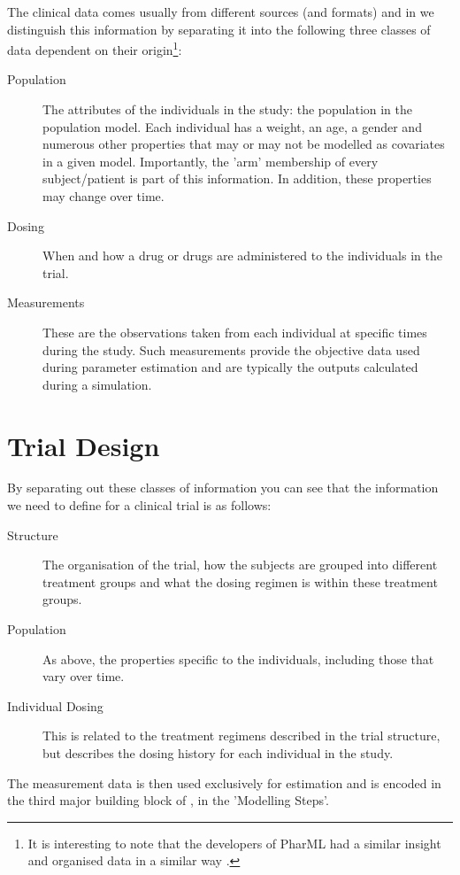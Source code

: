 
The clinical data comes usually from different sources (and formats) and 
in \pharmml we distinguish this information by separating it into the following three
classes of data dependent on their origin\footnote{It is interesting to note that the developers of
PharML had a similar insight and organised data in a similar
way \cite{NLMEcons:2008}.}:
%
\begin{description}
\item[Population] The attributes of the individuals in the study: the
  population in the population model. Each individual has a weight,
  an age, a gender and numerous other properties that may or may not
  be modelled as covariates in a given model. Importantly, the 'arm' 
  membership of every subject/patient is part of this information.
  In addition, these properties may change over time. 
\item[Dosing] When and how a drug or drugs are administered to the
  individuals in the trial.
\item[Measurements] These are the observations taken from each
  individual at specific times during the study. Such measurements
  provide the objective data used during parameter estimation and are
  typically the outputs calculated during a simulation.
\end{description}

\section{Trial Design}

By separating out these classes of information you can see that the
information we need to define for a clinical trial is as follows:
%
\begin{description}
\item[Structure] The organisation of the trial, how the subjects
  are grouped into different treatment groups and what the dosing
  regimen is within these treatment groups.
\item[Population] As above, the properties specific to the individuals,
  including those that vary over time.
\item[Individual Dosing] This is related to the treatment regimens
  described in the trial structure, but describes the dosing history
  for each individual in the study.
\end{description}
%
The measurement data is then used exclusively for estimation and
is encoded in the third major building block of \pharmml, in the 'Modelling 
Steps'.


